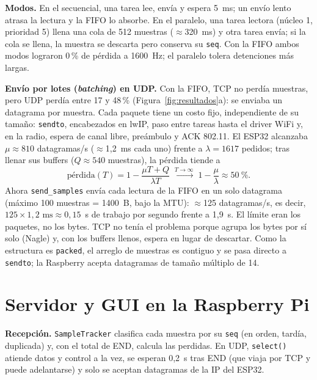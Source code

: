 \documentclass[11pt,a4paper]{report}
\begin{document}
\textbf{Modos.} En el secuencial, una tarea lee, envía y espera 5~ms; un envío lento atrasa la lectura y la FIFO lo absorbe. En el paralelo, una tarea lectora (núcleo 1, prioridad 5) llena una cola de 512 muestras ($\approx$320~ms) y otra tarea envía; si la cola se llena, la muestra se descarta pero conserva su \texttt{seq}. Con la FIFO ambos modos lograron 0\,\% de pérdida a 1600~Hz; el paralelo tolera detenciones más largas.

\textbf{Envío por lotes (\textit{batching}) en UDP.} Con la FIFO, TCP no perdía muestras, pero UDP perdía entre 17 y 48\,\% (Figura~\ref{fig:resultados}a): se enviaba un datagrama por muestra. Cada paquete tiene un costo fijo, independiente de su tamaño: \texttt{sendto}, encabezados en lwIP, paso entre tareas hasta el driver WiFi y, en la radio, espera de canal libre, preámbulo y ACK 802.11. El ESP32 alcanzaba $\mu\approx810$ datagramas/s ($\approx$1,2~ms cada uno) frente a $\lambda=1617$ pedidos; tras llenar sus buffers ($Q\approx540$ muestras), la pérdida tiende a
\begin{equation}
  \text{pérdida}(T)=1-\frac{\mu T+Q}{\lambda T}\;\xrightarrow{T\to\infty}\;1-\frac{\mu}{\lambda}\approx 50\ \text{\%}.
\end{equation}
Ahora \texttt{send\_samples} envía cada lectura de la FIFO en un solo datagrama (máximo 100 muestras = 1400~B, bajo la MTU): $\approx$125 datagramas/s, es decir, $125\times1{,}2\text{ ms}\approx0{,}15$~s de trabajo por segundo frente a 1,9~s. El límite eran los paquetes, no los bytes. TCP no tenía el problema porque agrupa los bytes por sí solo (Nagle) y, con los buffers llenos, espera en lugar de descartar. Como la estructura es \texttt{packed}, el arreglo de muestras es contiguo y se pasa directo a \texttt{sendto}; la Raspberry acepta datagramas de tamaño múltiplo de 14.

\chapter{Servidor y GUI en la Raspberry Pi}\label{cap:servidor}
\textbf{Recepción.} \texttt{SampleTracker} clasifica cada muestra por su \texttt{seq} (en orden, tardía, duplicada) y, con el total de END, calcula las perdidas. En UDP, \texttt{select()} atiende datos y control a la vez, se esperan 0,2~s tras END (que viaja por TCP y puede adelantarse) y solo se aceptan datagramas de la IP del ESP32.
\end{document}
